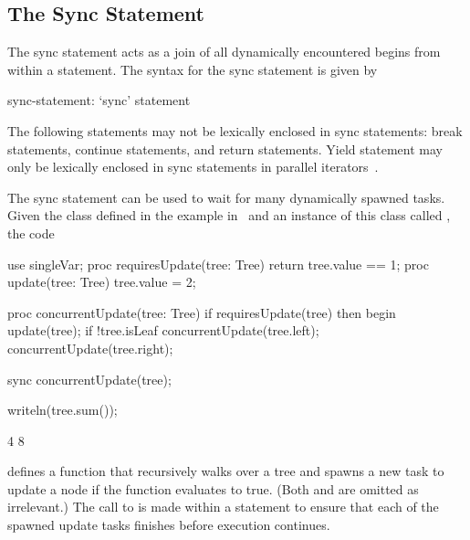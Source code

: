\subsection{The Sync Statement}
\label{Sync_Statement}

The sync statement acts as a join of all dynamically encountered
begins from within a statement.  The syntax for the sync statement is
given by
\begin{syntax}
sync-statement:
  `sync' statement
\end{syntax}
The following statements may not be lexically enclosed in
sync statements: break statements, continue statements, and
return statements.  Yield statement may only be lexically enclosed in
sync statements in parallel iterators~.

\begin{example}
The sync statement can be used to wait for many dynamically spawned
tasks.  Given the  class defined in the example
in~ and an instance of this class
called , the code
\begin{chapelpre}
use singleVar;
proc requiresUpdate(tree: Tree) {
  return tree.value == 1;
}
proc update(tree: Tree) {
  tree.value = 2;
}
\end{chapelpre}
\begin{chapel}
proc concurrentUpdate(tree: Tree) {
  if requiresUpdate(tree) then
    begin update(tree);
  if !tree.isLeaf {
    concurrentUpdate(tree.left);
    concurrentUpdate(tree.right);
  }
}

sync concurrentUpdate(tree);
\end{chapel}
\begin{chapelpost}
writeln(tree.sum());
\end{chapelpost}
\begin{chapeloutput}
4
8
\end{chapeloutput}
defines a function  that recursively walks over
a tree and spawns a new task to update a node if the
function  evaluates to true.
(Both  and  are omitted as
irrelevant.)  The call to  is made within
a  statement to ensure that each of the spawned update
tasks finishes before execution continues.
\end{example}

